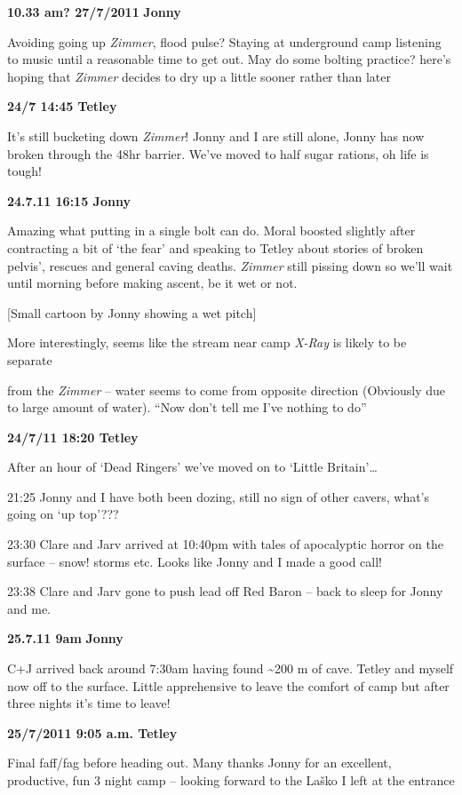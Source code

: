 \textbf{10.33 am? 27/7/2011} \textbf{Jonny}

Avoiding going up \emph{Zimmer}, flood pulse? Staying at underground
camp listening to music until a reasonable time to get out. May do some
bolting practice? here's hoping that \emph{Zimmer} decides to dry up a
little sooner rather than later

\textbf{24/7 14:45 Tetley}

It's still bucketing down \emph{Zimmer}! Jonny and I are still alone,
Jonny has now broken through the 48hr barrier. We've moved to half sugar
rations, oh life is tough!

\textbf{24.7.11 16:15 Jonny}

Amazing what putting in a single bolt can do. Moral boosted slightly
after contracting a bit of `the fear' and speaking to Tetley about
stories of broken pelvis', rescues and general caving deaths.
\emph{Zimmer} still pissing down so we'll wait until morning before
making ascent, be it wet or not.

{[}Small cartoon by Jonny showing a wet pitch{]}

More interestingly, seems like the stream near camp \emph{X-Ray} is
likely to be separate

from the \emph{Zimmer} -- water seems to come from opposite direction
(Obviously due to large amount of water). ``Now don't tell me I've
nothing to do''

\textbf{24/7/11 18:20 Tetley}

After an hour of `Dead Ringers' we've moved on to `Little
Britain'\ldots{}

21:25 Jonny and I have both been dozing, still no sign of other cavers,
what's going on `up top'???

23:30 Clare and Jarv arrived at 10:40pm with tales of apocalyptic horror
on the surface -- snow! storms etc. Looks like Jonny and I made a good
call!

23:38 Clare and Jarv gone to push lead off Red Baron -- back to sleep
for Jonny and me.

\textbf{25.7.11 9am} \textbf{Jonny}

C+J arrived back around 7:30am having found \textasciitilde 200 m of
cave. Tetley and myself now off to the surface. Little apprehensive to
leave the comfort of camp but after three nights it's time to leave!

\textbf{25/7/2011 9:05 a.m. Tetley}

Final faff/fag before heading out. Many thanks Jonny for an excellent,
productive, fun 3 night camp -- looking forward to the Laško I left at
the entrance

